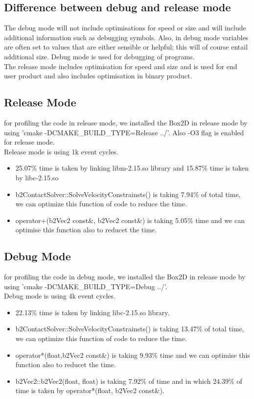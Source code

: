 \documentclass[11pt]{article}
\begin{document}
\subsection{Difference between debug and release mode}
The debug mode will not include optimisations for speed or size and will include additional information such as debugging symbols. Also, in debug mode variables are often set to values that are either sensible or helpful; this will of course entail additional size. Debug mode is used for debugging of programs.\\
The release mode includes optimisation for speed and size and is used for end user product and also includes optimisation in binary product.
\subsection{Release Mode}
for profiling the code in release mode, we installed the Box2D in release mode by using 'cmake -DCMAKE\_BUILD\_TYPE=Release ../'. Also -O3 flag is enabled for release mode.\\
Release mode is using 1k event cycles.\\
\begin{itemize}
\item 25.07\% time is taken by linking libm-2.15.so library and 15.87\% time is taken by libc-2.15.so 
\item b2ContactSolver::SolveVelocityConstrainsts() is taking 7.94\% of total time, we can optimize this function of code to reduce the time.
\item operator+(b2Vec2 const\&, b2Vec2 const\&) is taking 5.05\% time and we can optimise this function also to reducet the time.
\end{itemize}
\subsection{Debug Mode}
for profiling the code in debug mode, we installed the Box2D in release mode by using 'cmake -DCMAKE\_BUILD\_TYPE=Debug ../'. \\
Debug mode is using 4k event cycles.\\
\begin{itemize}
\item 22.13\% time is taken by linking libc-2.15.so library.
\item b2ContactSolver::SolveVelocityConstrainsts() is taking 13.47\% of total time, we can optimize this function of code to reduce the time.
\item operator*(float,b2Vec2 const\&) is taking 9.93\% time and we can optimise this function also to reducet the time.
\item b2Vec2::b2Vec2(float, float) is taking 7.92\% of time and in which 24.39\% of time is taken by operator*(float, b2Vec2 const\&).
\end{itemize}
\end{document}
